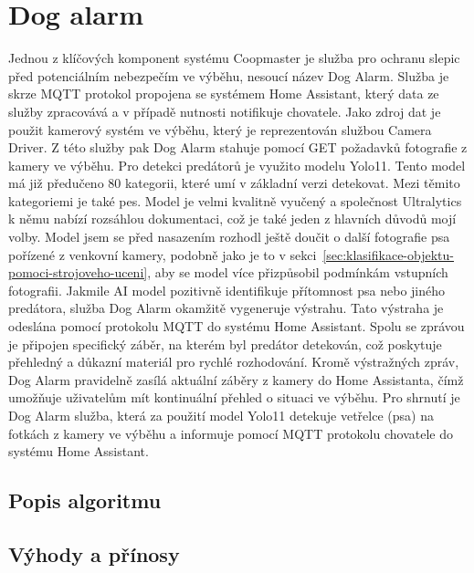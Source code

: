 \section{Dog alarm}\label{sec:dog-alarm}
Jednou z klíčových komponent systému Coopmaster je služba pro ochranu slepic před potenciálním nebezpečím ve výběhu, nesoucí název Dog Alarm.\newline
Služba je skrze MQTT protokol propojena se systémem Home Assistant, který data ze služby zpracovává a v případě nutnosti notifikuje chovatele.
Jako zdroj dat je použit kamerový systém ve výběhu, který je reprezentován službou Camera Driver.
Z této služby pak Dog Alarm stahuje pomocí GET požadavků fotografie z kamery ve výběhu.\newline
Pro detekci predátorů je využito modelu Yolo11.
Tento model má již předučeno 80 kategorii, které umí v základní verzi detekovat.
Mezi těmito kategoriemi je také pes.
Model je velmi kvalitně vyučený a společnost Ultralytics k němu nabízí rozsáhlou dokumentaci, což je také jeden z hlavních důvodů mojí volby.
Model jsem se před nasazením rozhodl ještě doučit o další fotografie psa pořízené z venkovní kamery, podobně jako je to v sekci~\ref{sec:klasifikace-objektu-pomoci-strojoveho-uceni}, aby se model více přizpůsobil podmínkám vstupních fotografii.\newline
Jakmile AI model pozitivně identifikuje přítomnost psa nebo jiného predátora, služba Dog Alarm okamžitě vygeneruje výstrahu.
Tato výstraha je odeslána pomocí protokolu MQTT do systému Home Assistant.
Spolu se zprávou je připojen specifický záběr, na kterém byl predátor detekován, což poskytuje přehledný a důkazní materiál pro rychlé rozhodování.
Kromě výstražných zpráv, Dog Alarm pravidelně zasílá aktuální záběry z kamery do Home Assistanta, čímž umožňuje uživatelům mít kontinuální přehled o situaci ve výběhu.\newline
Pro shrnutí je Dog Alarm služba, která za použití model Yolo11 detekuje vetřelce (psa) na fotkách z kamery ve výběhu a informuje pomocí MQTT protokolu chovatele do systému Home Assistant.

\subsection*{Popis algoritmu}




\subsection*{Výhody a přínosy}

